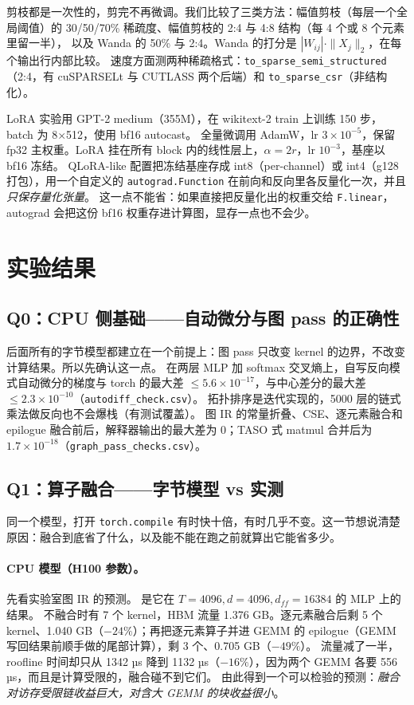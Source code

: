 \documentclass[11pt,a4paper]{ctexart}
\begin{document}
剪枝都是一次性的，剪完不再微调。我们比较了三类方法：幅值剪枝（每层一个全局阈值）的 30/50/70\% 稀疏度、幅值剪枝的 2:4 与 4:8 结构（每 4 个或 8 个元素里留一半），
以及 Wanda 的 50\% 与 2:4。Wanda 的打分是 $|W_{ij}|\cdot\|X_j\|_2$，在每个输出行内部比较。
速度方面测两种稀疏格式：\texttt{to\_sparse\_semi\_structured}（2:4，有 cuSPARSELt 与 CUTLASS 两个后端）和 \texttt{to\_sparse\_csr}（非结构化）。

LoRA 实验用 GPT-2 medium（355M），在 wikitext-2 train 上训练 150 步，batch 为 8$\times$512，使用 bf16 autocast。
全量微调用 AdamW，lr $3\times10^{-5}$，保留 fp32 主权重。LoRA 挂在所有 block 内的线性层上，$\alpha=2r$，lr $10^{-3}$，基座以 bf16 冻结。
QLoRA-like 配置把冻结基座存成 int8（per-channel）或 int4（g128 打包），用一个自定义的 \texttt{autograd.Function} 在前向和反向里各反量化一次，并且\emph{只保存量化张量}。
这一点不能省：如果直接把反量化出的权重交给 \texttt{F.linear}，autograd 会把这份 bf16 权重存进计算图，显存一点也不会少。

\section{实验结果}

\subsection{Q0：CPU 侧基础——自动微分与图 pass 的正确性}

后面所有的字节模型都建立在一个前提上：图 pass 只改变 kernel 的边界，不改变计算结果。所以先确认这一点。
在两层 MLP 加 softmax 交叉熵上，自写反向模式自动微分的梯度与 torch 的最大差 $\le 5.6\times10^{-17}$，与中心差分的最大差 $\le 2.3\times10^{-10}$（\texttt{autodiff\_check.csv}）。
拓扑排序是迭代实现的，5000 层的链式乘法做反向也不会爆栈（有测试覆盖）。
图 IR 的常量折叠、CSE、逐元素融合和 epilogue 融合前后，解释器输出的最大差为 0；TASO 式 matmul 合并后为 $1.7\times10^{-18}$（\texttt{graph\_pass\_checks.csv}）。

\subsection{Q1：算子融合——字节模型 vs 实测}

同一个模型，打开 \texttt{torch.compile} 有时快十倍，有时几乎不变。这一节想说清楚原因：融合到底省了什么，以及能不能在跑之前就算出它能省多少。

\paragraph{CPU 模型（H100 参数）。}先看实验室图 IR 的预测。 是它在 $T{=}4096,d{=}4096,d_{ff}{=}16384$ 的 MLP 上的结果。
不融合时有 7 个 kernel，HBM 流量 1.376 GB。逐元素融合后剩 5 个 kernel、1.040 GB（$-24\%$）；再把逐元素算子并进 GEMM 的 epilogue（GEMM 写回结果前顺手做的尾部计算），剩 3 个、0.705 GB（$-49\%$）。
流量减了一半，roofline 时间却只从 1342 µs 降到 1132 µs（$-16\%$），因为两个 GEMM 各要 556 µs，而且是计算受限的，融合碰不到它们。
由此得到一个可以检验的预测：\emph{融合对访存受限链收益巨大，对含大 GEMM 的块收益很小}。
\end{document}
